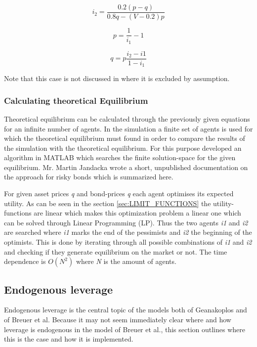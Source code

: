 \documentclass[../Bachelorarbeit.tex]{subfiles}
\begin{document}
\begin{equation}
i_{2} = \frac{0.2(p - q)}{0.8q - (V - 0.2)p}
\end{equation}

\begin{equation}
p = \frac{1}{i_{1}} - 1
\end{equation}

\begin{equation}
q = p \frac{i_{2} - i{1}}{1 - i_{1}}
\end{equation}

Note that this case is not discussed in \cite{Geanakoplos2009} where it is excluded by assumption.

\subsubsection{Calculating theoretical Equilibrium}
Theoretical equilibrium can be calculated through the previously given equations for an infinite number of agents. In the simulation a finite set of agents is used for which the theoretical equilibrium must found in order to compare the results of the simulation with the theoretical equilibrium. For this purpose \cite{Breuer2015} developed an algorithm in MATLAB which searches the finite solution-space for the given equilibrium. Mr. Martin Jandacka wrote a short, unpublished documentation on the approach for risky bonds which is summarized here.

\medskip

For given asset prices \textit{q} and bond-prices \textit{q} each agent optimises its expected utility. As can be seen in the section \ref{sec:LIMIT_FUNCTIONS} the utility-functions are linear which makes this optimization problem a linear one which can be solved through Linear Programming (LP). Thus the two agents \textit{i1} and \textit{i2} are searched where \textit{i1} marks the end of the pessimists and \textit{i2} the beginning of the optimists. This is done by iterating through all possible combinations of \textit{i1} and \textit{i2} and checking if they generate equilibrium on the market or not. The time dependence is $O(N^2)$ where \textit{N} is the amount of agents. 

\subsection{Endogenous leverage}
Endogenous leverage is the central topic of the models both of Geanakoplos and of Breuer et al. Because it may not seem immediately clear where and how leverage is endogenous in the model of Breuer et al., this section outlines where this is the case and how it is implemented. 
\end{document}
